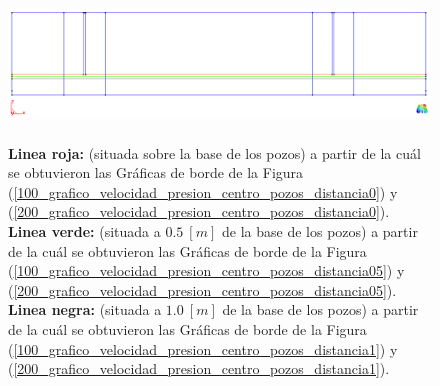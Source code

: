 \documentclass[10pt,a4paper,final]{article}
\begin{document}
\begin{figure}[H]
\centerline{\includegraphics[scale=0.4]{img/200m/perfiles}}
\caption{\\\textbf{Linea roja:} (situada sobre la base de los pozos) a partir de la cuál se obtuvieron las Gráficas de borde de la Figura (\ref{100_grafico_velocidad_presion_centro_pozos_distancia0}) y (\ref{200_grafico_velocidad_presion_centro_pozos_distancia0}).\\
\textbf{Linea verde:} (situada a $0.5~[m]$ de la base de los pozos) a partir de la cuál se obtuvieron las Gráficas de borde de la Figura (\ref{100_grafico_velocidad_presion_centro_pozos_distancia05}) y (\ref{200_grafico_velocidad_presion_centro_pozos_distancia05}).
\\\textbf{Linea negra:} (situada a $1.0~[m]$ de la base de los pozos) a partir de la cuál se obtuvieron las Gráficas de borde de la Figura (\ref{100_grafico_velocidad_presion_centro_pozos_distancia1}) y (\ref{200_grafico_velocidad_presion_centro_pozos_distancia1}).}
\label{perfiles}
\end{figure}
\end{document}

